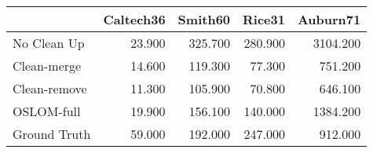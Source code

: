 \begin{tabular}{lrrrr}
\toprule
{} & Caltech36 & Smith60 &  Rice31 & Auburn71 \\
\midrule
No Clean Up  &    23.900 & 325.700 & 280.900 & 3104.200 \\
Clean-merge  &    14.600 & 119.300 &  77.300 &  751.200 \\
Clean-remove &    11.300 & 105.900 &  70.800 &  646.100 \\
OSLOM-full   &    19.900 & 156.100 & 140.000 & 1384.200 \\
Ground Truth &    59.000 & 192.000 & 247.000 &  912.000 \\
\bottomrule
\end{tabular}
